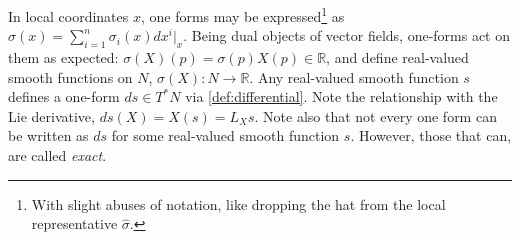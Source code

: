 \documentclass[psamsfonts]{amsart}
\theoremstyle{definition}
\theoremstyle{remark}
\newcommand*\R{\mathds{R}}
\numberwithin{equation}{section}
\begin{document}
{In local coordinates $x$, one forms may be expressed\footnote{With slight abuses of notation, like dropping the hat from the local representative $\hat \sigma$.} as $\sigma(x) = \sum_{i=1}^n \sigma_i(x)dx^i\vert_{x}$. Being dual objects of vector fields, one-forms act on them as expected: $\sigma(X)(p) = \sigma(p)X(p) \in \R$, and define real-valued smooth functions on $N$, $\sigma(X) : N \rightarrow \R$. Any real-valued smooth function $s$ defines a one-form $ds\in T^*N$ via \eqref{def:differential}. Note the relationship with the Lie derivative, $ds(X) = X(s) = L_Xs$. Note also that not every one form can be written as $ds$ for some real-valued smooth function $s$. However, those that can, are called \textit{exact}. 






}
\end{document}
